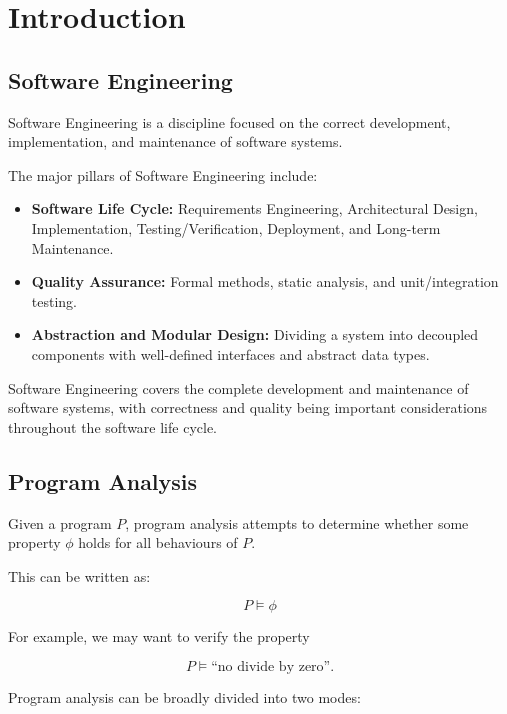 \chapter{Introduction}

\section{Software Engineering}

Software Engineering is a discipline focused on the correct development,
implementation, and maintenance of software systems.

The major pillars of Software Engineering include:

\begin{itemize}
    \item \textbf{Software Life Cycle:} Requirements Engineering,
    Architectural Design, Implementation, Testing/Verification,
    Deployment, and Long-term Maintenance.

    \item \textbf{Quality Assurance:} Formal methods, static analysis,
    and unit/integration testing.

    \item \textbf{Abstraction and Modular Design:} Dividing a system
    into decoupled components with well-defined interfaces and
    abstract data types.
\end{itemize}

\begin{ppnote}
Software Engineering covers the complete development and maintenance
of software systems, with correctness and quality being important
considerations throughout the software life cycle.
\end{ppnote}


\section{Program Analysis}

Given a program $P$, program analysis attempts to determine whether
some property $\phi$ holds for all behaviours of $P$.

This can be written as:

\[
P \models \phi
\]

For example, we may want to verify the property

\[
P \models \text{``no divide by zero''}.
\]

Program analysis can be broadly divided into two modes:

